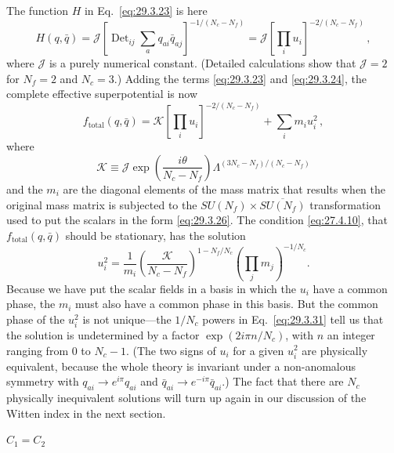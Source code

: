 The function \(H\) in Eq.~\eqref{eq:29.3.23} is here
\begin{equation}
  H(q,\bar q)
  =
  \mathcal{J}
  \left[
    \operatorname{Det}_{ij}\sum_a q_{ai}\bar q_{aj}
  \right]^{-1/(N_c-N_f)}
  =
  \mathcal{J}
  \left[\prod_i u_i\right]^{-2/(N_c-N_f)}\,,
  \tag{29.3.28}\label{eq:29.3.28}
\end{equation}
where \(\mathcal{J}\) is a purely numerical constant. (Detailed
calculations show that \(\mathcal{J}=2\) for \(N_f=2\) and \(N_c=3\).)
Adding the terms \eqref{eq:29.3.23} and \eqref{eq:29.3.24}, the complete
effective superpotential is now
\begin{equation}
  f_{\mathrm{total}}(q,\bar q)
  =
  \mathcal{K}
  \left[\prod_i u_i\right]^{-2/(N_c-N_f)}
  +\sum_i m_i u_i^2\,,
  \tag{29.3.29}\label{eq:29.3.29}
\end{equation}
where
\begin{equation}
  \mathcal{K}
  \equiv
  \mathcal{J}
  \exp\left(\frac{i\theta}{N_c-N_f}\right)
  \Lambda^{(3N_c-N_f)/(N_c-N_f)}
  \tag{29.3.30}\label{eq:29.3.30}
\end{equation}
and the \(m_i\) are the diagonal elements of the mass matrix that results
when the original mass matrix is subjected to the
\(SU(N_f)\times\overline{SU(N_f)}\) transformation used to put
the scalars in the form \eqref{eq:29.3.26}. The condition
\eqref{eq:27.4.10}, that \(f_{\mathrm{total}}(q,\bar q)\) should be
stationary, has the solution
\begin{equation}
  u_i^2
  =
  \frac{1}{m_i}
  \left(\frac{\mathcal{K}}{N_c-N_f}\right)^{1-N_f/N_c}
  \left(\prod_j m_j\right)^{-1/N_c}.
  \tag{29.3.31}\label{eq:29.3.31}
\end{equation}
Because we have put the scalar fields in a basis in which the \(u_i\) have
a common phase, the \(m_i\) must also have a common phase in this basis.
But the common phase of the \(u_i^2\) is not unique---the \(1/N_c\) powers
in Eq.~\eqref{eq:29.3.31} tell us that the solution is undetermined by a
factor \(\exp(2i\pi n/N_c)\), with \(n\) an integer ranging from 0 to
\(N_c-1\). (The two signs of \(u_i\) for a given \(u_i^2\) are physically
equivalent, because the whole theory is invariant under a non-anomalous
symmetry with \(q_{ai}\longrightarrow e^{i\pi}q_{ai}\) and
\(\bar q_{ai}\longrightarrow e^{-i\pi}\bar q_{ai}\).) The fact that there
are \(N_c\) physically inequivalent solutions will turn up again in our
discussion of the Witten index in the next section.

\begin{center}
  \(C_1=C_2\)
\end{center}

